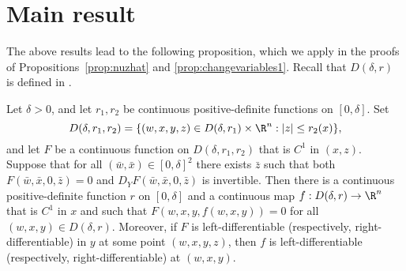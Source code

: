 \section{Main result}

The above results lead to the following proposition, which we apply
in the proofs of Propositions~\ref{prop:nuzhat} and \ref{prop:changevariables1}.
Recall that $D(\delta, r)$ is defined in .

\begin{prop}
\label{prop:IFT-re}
Let $\delta > 0$, and let $r_1, r_2$ be continuous positive-definite functions on $[0, \delta]$.
Set
\begin{equation}
    D(\delta, r_1, r_2)
    =
    \{ (w, x, y, z) \in D(\delta, r_1) \times \R^n : |z| \leq r_2(x) \},
\end{equation}
and let $F$ be a continuous function on $D(\delta, r_1, r_2)$ that is $C^1$ in $(x, z)$.
Suppose that for all $(\bar w, \bar x) \in [0, \delta]^2$ there exists $\bar z$
such that both $F(\bar w, \bar x, 0, \bar z) = 0$
and $D_Y F(\bar w, \bar x, 0, \bar z)$ is invertible.
Then there is a continuous positive-definite function $r$ on $[0, \delta]$ and
a continuous map $f : D(\delta, r) \to \R^n$
that is $C^1$ in $x$
and such that $F(w, x, y, f(w, x, y)) = 0$
for all $(w, x, y) \in D(\delta, r)$.
Moreover, if $F$ is left-differentiable
(respectively, right-differentiable) in $y$ at some point $(w, x, y, z)$,
then $f$ is left-differentiable (respectively, right-differentiable) at $(w, x, y)$.
\end{prop}

